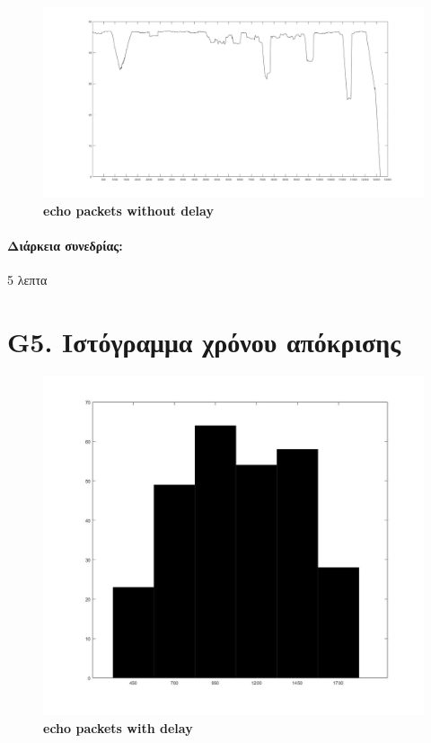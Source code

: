 \documentclass{article}
\begin{document}
\begin{figure}[h!]
 \begin{center}
 \advance\leftskip-6cm
  \includegraphics[width=240mm,scale=0.7]{g4s2.jpg}
   \caption*{\textbf{echo packets without delay}}
  
\end{center}
\end{figure}
\paragraph{Διάρκεια συνεδρίας:} 5 λεπτα
\newpage
\large{}

\section*{G5. Ιστόγραμμα χρόνου απόκρισης}

\begin{figure}[h!]
 \begin{center}
 \advance\leftskip-2.3cm
  \includegraphics[width=160mm,scale=0.7]{g5s2.jpg}
    \caption*{\textbf{echo packets with delay}}
  
\end{center}
\end{figure}
\end{document}
